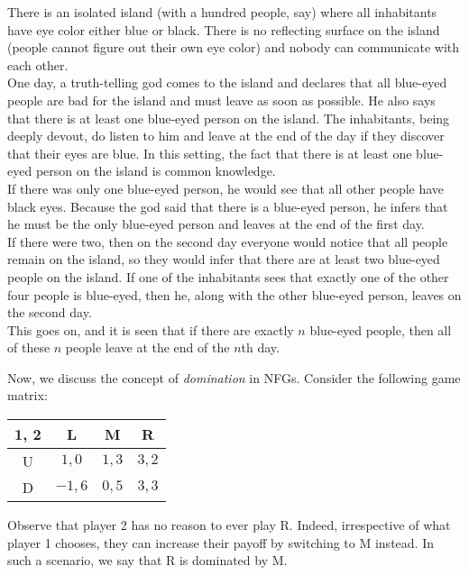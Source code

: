 	\begin{fex}
		There is an isolated island (with a hundred people, say) where all inhabitants have eye color either blue or black. There is no reflecting surface on the island (people cannot figure out their own eye color) and nobody can communicate with each other.\\
		One day, a truth-telling god comes to the island and declares that all blue-eyed people are bad for the island and must leave as soon as possible. He also says that there is at least one blue-eyed person on the island. The inhabitants, being deeply devout, do listen to him and leave at the end of the day if they discover that their eyes are blue. In this setting, the fact that there is at least one blue-eyed person on the island is common knowledge. \\

		If there was only one blue-eyed person, he would see that all other people have black eyes. Because the god said that there is a blue-eyed person, he infers that he must be the only blue-eyed person and leaves at the end of the first day.\\
		If there were two, then on the second day everyone would notice that all people remain on the island, so they would infer that there are at least two blue-eyed people on the island. If one of the inhabitants sees that exactly one of the other four people is blue-eyed, then he, along with the other blue-eyed person, leaves on the second day.\\
		This goes on, and it is seen that if there are exactly $n$ blue-eyed people, then all of these $n$ people leave at the end of the $n$th day.\\
	\end{fex}

	Now, we discuss the concept of \emph{domination} in NFGs. Consider the following game matrix:

	\begin{center}
	\begin{tabular}{|c||c|c|c|}
		\hline
		1, 2 & \textsf{L} & \textsf{M} & \textsf{R} \\
		\hline \hline
		\textsf{U} & $1, 0$ & $1,3$ & $3,2$ \\
		\hline
		\textsf{D} & $-1,6$ & $0,5$ & $3,3$ \\
		\hline
	\end{tabular}
	\end{center}

	Observe that player \textsf{2} has no reason to ever play R. Indeed, irrespective of what player \textsf{1} chooses, they can increase their payoff by switching to M instead. In such a scenario, we say that R is dominated by M.\\

